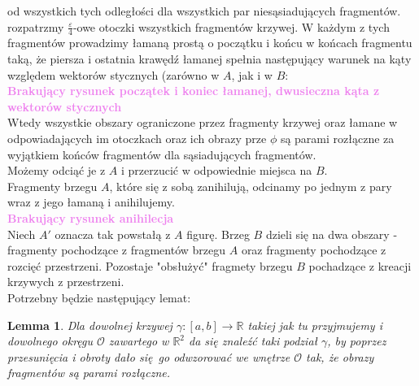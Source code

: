 \documentclass[a4paper, 12pt]{article}
\newtheorem{lemma}[observation]{Lemma}
\newcommand{\rysunek}[1]{\hfill \break\\[16pt] \Huge \textbf{\textcolor{violet}{Brakujący rysunek \normalsize
#1}} \hfill
\break \\[16pt] \normalsize}
\begin{document}
od wszystkich tych odległości dla wszystkich par niesąsiadujących fragmentów. \\
rozpatrzmy $\frac{\varepsilon}{4}$-owe otoczki wszystkich fragmentów krzywej. W każdym z tych fragmentów
prowadzimy
łamaną prostą o początku i końcu w końcach fragmentu taką, że piersza i ostatnia krawędź łamanej
\label{180 stopni} spełnia
następujący warunek na kąty względem wektorów stycznych (zarówno w $A$, jak i w $B$:
\rysunek{początek i koniec łamanej, dwusieczna kąta  z wektorów stycznych}
Wtedy wszystkie obszary ograniczone przez fragmenty krzywej oraz łamane w odpowiadających im
otoczkach oraz ich obrazy prze $\phi$ są parami rozłączne za wyjątkiem końców fragmentów dla
sąsiadujących fragmentów. \\
Możemy odciąć je z $A$ i przerzucić w odpowiednie miejsca na $B$. \\
Fragmenty brzegu $A$, które się z sobą zanihilują, odcinamy po jednym z pary wraz z jego łamaną i
anihilujemy.
\rysunek{anihilecja}
Niech $A'$ oznacza tak powstałą z $A$ figurę.
Brzeg $B$ dzieli się na dwa obszary - fragmenty pochodzące z fragmentów brzegu $A$ oraz fragmenty
pochodzące z rozcięć przestrzeni.
Pozostaje "obsłużyć" fragmety brzegu $B$ pochadzące z kreacji krzywych z przestrzeni. \\
Potrzebny będzie następujący lemat:
\begin{lemma}\label{lemat o dzieleniu}
    Dla dowolnej krzywej $\gamma : [a, b] \to \mathbb{R}$ takiej jak tu przyjmujemy i dowolnego okręgu
    $\mathcal{O}$ zawartego w $\mathbb{R}^2$ da się znaleźć taki podział $\gamma$, by poprzez
    przesunięcia i obroty
    dało się go odwzorować we wnętrze $\mathcal{O}$ tak, że obrazy fragmentów są parami rozłączne.
\end{lemma}
\end{document}
